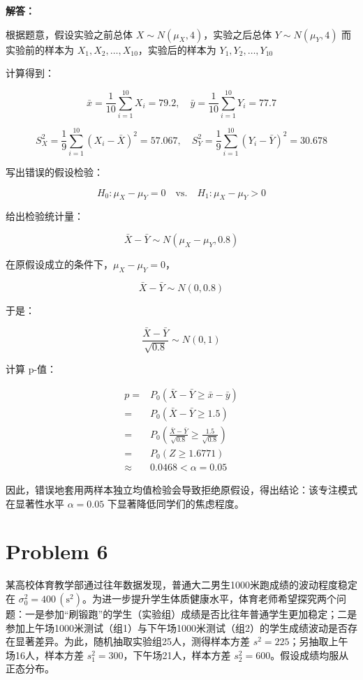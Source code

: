 \documentclass[12pt,a4paper]{article}
\begin{document}
\begin{answerbox}
\textbf{解答：}

根据题意，假设实验之前总体 $X \sim N(\mu_X, 4)$，实验之后总体 $Y \sim N(\mu_Y, 4)$
而实验前的样本为 $X_1, X_2, \ldots, X_{10}$，实验后的样本为 $Y_1, Y_2, \ldots, Y_{10}$

计算得到：

$$
\bar{x} = \frac{1}{10} \sum_{i=1}^{10} X_i = 79.2, \quad \bar{y} = \frac{1}{10} \sum_{i=1}^{10} Y_i = 77.7
$$

$$
S_X^2 = \frac{1}{9} \sum_{i=1}^{10} (X_i - \bar{X})^2 = 57.067, \quad S_Y^2 = \frac{1}{9} \sum_{i=1}^{10} (Y_i - \bar{Y})^2 = 30.678
$$

写出错误的假设检验：

$$
H_0: \mu_X - \mu_Y = 0 \quad \text{vs.} \quad H_1: \mu_X - \mu_Y > 0
$$

给出检验统计量：

$$
\bar{X} - \bar{Y} \sim N\left(\mu_X - \mu_Y, 0.8\right)
$$

在原假设成立的条件下，$\mu_X - \mu_Y = 0$，

$$
\bar{X} - \bar{Y} \sim N\left(0, 0.8\right)
$$

于是：

$$
\frac{\bar{X} - \bar{Y}}{\sqrt{0.8}} \sim N\left(0, 1\right)
$$

计算 p-值：

$$
\begin{aligned}
p =& P_{0}\left(\bar{X} - \bar{Y} \geq \bar{x} - \bar{y}\right) \\
=& P_{0}\left(\bar{X} - \bar{Y} \geq 1.5\right) \\
=& P_{0}\left(\frac{\bar{X} - \bar{Y}}{\sqrt{0.8}} \geq \frac{1.5}{\sqrt{0.8}}\right) \\
=& P_{0}\left(Z \geq 1.6771\right) \\
\approx& 0.0468 < \alpha = 0.05
\end{aligned}
$$

因此，错误地套用两样本独立均值检验会导致拒绝原假设，得出结论：该专注模式在显著性水平 $\alpha=0.05$ 下显著降低同学们的焦虑程度。

\end{answerbox}

\section{Problem 6}

某高校体育教学部通过往年数据发现，普通大二男生1000米跑成绩的波动程度稳定在 $\sigma_0^2=400\,(\mathrm{s}^2)$。为进一步提升学生体质健康水平，体育老师希望探究两个问题：一是参加“刷锻跑”的学生（实验组）成绩是否比往年普通学生更加稳定；二是参加上午场1000米测试（组1）与下午场1000米测试（组2）的学生成绩波动是否存在显著差异。为此，随机抽取实验组25人，测得样本方差 $s^2=225$；另抽取上午场16人，样本方差 $s_1^2=300$，下午场21人，样本方差 $s_2^2=600$。假设成绩均服从正态分布。
\end{document}
